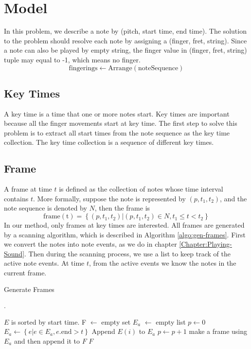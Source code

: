 \section{Model}
In this problem, we describe a note by (pitch, start time, end time). The solution to the problem should resolve each note by assigning a (finger, fret, string). Since a note can also be played by empty string, the finger value in (finger, fret, string) tuple may equal to -1, which means no finger. 
\[
\mathrm{fingerings} \gets \mathrm{Arrange}(\mathrm{noteSequence})
\]

\subsection{Key Times}
A key time is a time that one or more notes start. Key times are important because all the finger movements start at key time. The first step to solve this problem is to extract all start times from the note sequence as the key time collection. The key time collection is a sequence of different key times.

\subsection{Frame}
A frame at time $t$ is defined as the collection of notes whose time interval contains $t$. More formally, suppose the note is represented by $(p, t_1, t_2)$, and the note sequence is denoted by $N$, then the frame is \[
\mathrm{frame(t)} = \left\{ (p, t_1, t_2) | (p, t_1, t_2) \in N, t_1 \le t < t_2 \right\}
\]
In our method, only frames at key times are interested. All frames are generated by a scanning algorithm, which is described in Algorithm \ref{algo:gen-frames}. First we convert the notes into note events, as we do in chapter \ref{Chapter:Playing-Sound}. Then during the scanning process, we use a list to keep track of the active note events. At time $t$, from the active events we know the notes in the current frame.

\begin{algorithm}[h]
    \caption{Generate Frames} \label{algo:gen-frames}.
    \begin{algorithmic}
         
            \Require $E$ is sorted by start time.
            \State F $\gets$ empty set 
            \State $E_a$ $\gets$ empty list 
            \State $p \gets 0$
                \State $E_a \gets \left\{e | e \in E_a, e.\mathrm{end} > t \right\}$
                    \State Append $E(i)$ to $E_a$
                    \State $p \gets p + 1$
                \EndWhile
            \EndFor
            \State make a frame using $E_a$ and then append it to $F$
            \State \Return $F$
        \EndFunction

    \end{algorithmic}
\end{algorithm}

